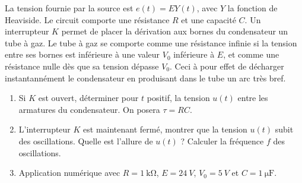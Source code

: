   \begin{exercice}
    La tension fournie par la source est \(e(t) = E Y(t)\), avec \(Y\) la fonction de Heaviside. Le circuit comporte une résistance \(R\) et une capacité \(C\). Un interrupteur \(K\) permet de placer la dérivation aux bornes du condensateur un tube à gaz. Le tube à gaz se comporte comme une résistance infinie si la tension entre ses bornes est inférieure à une valeur \(V_0\) inférieure à \(E\), et comme une résistance nulle dès que sa tension dépasse \(V_0\). Ceci à pour effet de décharger instantannément le condensateur en produisant dans le tube un arc très bref.

    \begin{enumerate}
      \item Si \(K\) est ouvert, déterminer pour \(t\) positif, la tension \(u(t)\) entre les armatures du condensateur. On posera \(\tau = RC\).
      \item L'interrupteur \(K\) est maintenant fermé, montrer que la tension \(u(t)\) subit des oscillations. Quelle est l'allure de \(u(t)\) ? Calculer la fréquence \(f\) des oscillations.
      \item Application numérique avec \(R=\SI{1}{\kilo\ohm}\), \(E=\SI{24}{V}\), \(V_0=\SI{5}{V}\) et \(C=\SI{1}{\micro\farad}\).
    \end{enumerate}
  \end{exercice}
